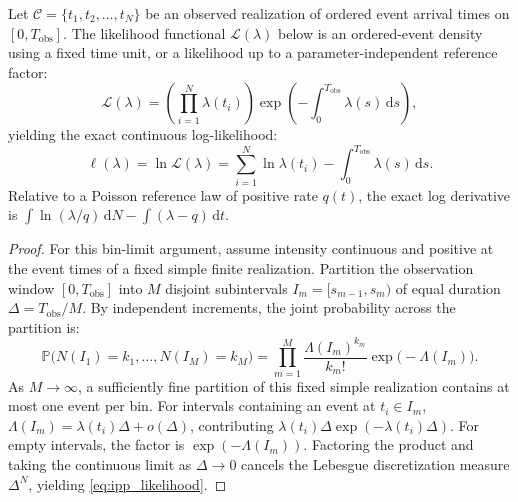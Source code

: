 \begin{proposition}
  \label{prop:ipp_likelihood}
  Let $\mathcal{C} = \{t_1, t_2, \dots, t_N\}$ be an observed
  realization of ordered event arrival times on $[0,
  T_{\mathrm{obs}}]$. The likelihood functional
  $\mathcal{L}(\lambda)$ below is an ordered-event density using a fixed
  time unit, or a likelihood up to a parameter-independent reference factor:
  \begin{equation}
    \mathcal{L}(\lambda) = \left( \prod_{i=1}^N \lambda(t_i) \right)
    \exp\left( -\int_0^{T_{\mathrm{obs}}} \lambda(s) \, \mathrm{d}s \right),
    \label{eq:ipp_likelihood}
  \end{equation}
  yielding the exact continuous log-likelihood:
  \begin{equation}
    \ell(\lambda) = \ln \mathcal{L}(\lambda) = \sum_{i=1}^N \ln
    \lambda(t_i) - \int_0^{T_{\mathrm{obs}}} \lambda(s) \, \mathrm{d}s.
    \label{eq:ipp_log_likelihood}
  \end{equation}
  Relative to a Poisson reference law of positive rate $q(t)$, the exact
  log derivative is $\int\ln(\lambda/q)\,\mathrm{d}N
  -\int(\lambda-q)\,\mathrm{d}t$.
\end{proposition}

\begin{proof}
  For this bin-limit argument, assume intensity continuous and positive
  at the event times of a fixed simple finite realization.
  Partition the observation window $[0, T_{\mathrm{obs}}]$ into $M$
  disjoint subintervals $I_m = [s_{m-1}, s_m)$ of equal duration
  $\Delta = T_{\mathrm{obs}}/M$. By independent increments, the
  joint probability across the partition is:
  \begin{equation}
    \mathbb{P}\bigl(N(I_1) = k_1, \dots, N(I_M) = k_M\bigr) =
    \prod_{m=1}^M \frac{\Lambda(I_m)^{k_m}}{k_m!}
    \exp\bigl(-\Lambda(I_m)\bigr).
  \end{equation}
  As $M\to\infty$, a sufficiently fine partition of this fixed
  simple realization contains at most one event per bin. For
  intervals containing an event at $t_i \in I_m$, $\Lambda(I_m) =
  \lambda(t_i)\Delta + o(\Delta)$, contributing $\lambda(t_i)\Delta
  \exp(-\lambda(t_i)\Delta)$. For empty intervals, the factor is
  $\exp(-\Lambda(I_m))$. Factoring the product and taking the
  continuous limit as $\Delta \to 0$ cancels the Lebesgue
  discretization measure $\Delta^N$, yielding \cref{eq:ipp_likelihood}.
\end{proof}

